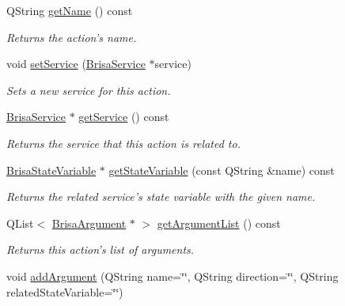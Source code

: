 \begin{DoxyCompactItemize}
QString \hyperlink{classBrisaUpnp_1_1BrisaAction_a409d834cfb64c57e4639d729a0885483}{getName} () const 
\begin{DoxyCompactList}\small\item\em Returns the action's name. \item\end{DoxyCompactList}\item 
void \hyperlink{classBrisaUpnp_1_1BrisaAction_a81b762ee7bd271a83ccc06f6755b84d8}{setService} (\hyperlink{classBrisaUpnp_1_1BrisaService}{BrisaService} $\ast$service)
\begin{DoxyCompactList}\small\item\em Sets a new service for this action. \item\end{DoxyCompactList}\item 
\hyperlink{classBrisaUpnp_1_1BrisaService}{BrisaService} $\ast$ \hyperlink{classBrisaUpnp_1_1BrisaAction_a64e61dbdbffaa72111277c54b4b0aa65}{getService} () const 
\begin{DoxyCompactList}\small\item\em Returns the service that this action is related to. \item\end{DoxyCompactList}\item 
\hyperlink{classBrisaUpnp_1_1BrisaStateVariable}{BrisaStateVariable} $\ast$ \hyperlink{classBrisaUpnp_1_1BrisaAction_a23fd74faf42b1008a6d924a3b3007797}{getStateVariable} (const QString \&name) const 
\begin{DoxyCompactList}\small\item\em Returns the related service's state variable with the given {\itshape name\/}. \item\end{DoxyCompactList}\item 
QList$<$ \hyperlink{classBrisaUpnp_1_1BrisaArgument}{BrisaArgument} $\ast$ $>$ \hyperlink{classBrisaUpnp_1_1BrisaAction_a2879477a3ade3b8529266cbf602b16b5}{getArgumentList} () const 
\begin{DoxyCompactList}\small\item\em Returns this action's list of arguments. \item\end{DoxyCompactList}\item 
void \hyperlink{classBrisaUpnp_1_1BrisaAction_a1a805cde62089c0c16a52c5ffd0c1370}{addArgument} (QString name=\char`\"{}\char`\"{}, QString direction=\char`\"{}\char`\"{}, QString relatedStateVariable=\char`\"{}\char`\"{})

\end{DoxyCompactItemize}
